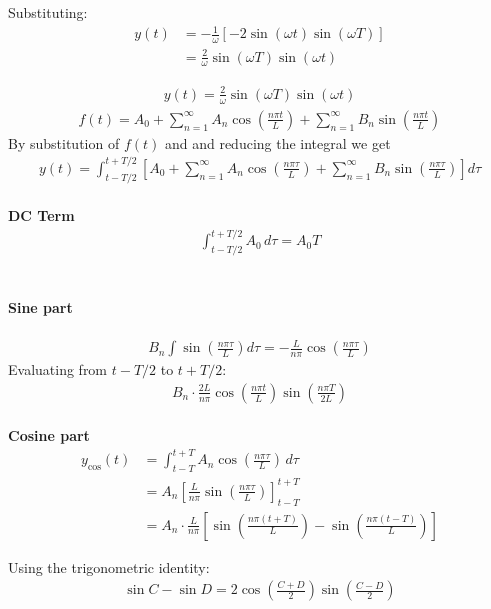Substituting:
\begin{align*}
y(t) &= -\frac{1}{\omega} \left[ -2 \sin(\omega t) \sin(\omega T) \right] \\
&= \frac{2}{\omega} \sin(\omega T) \sin(\omega t)
\end{align*}

\begin{align*}
y(t) = \frac{2}{\omega} \sin(\omega T) \sin(\omega t)    
\end{align*}
\newpage
\begin{align*}
f(t) = A_0 + \sum_{n=1}^\infty A_n \cos\left(\frac{n\pi t}{L}\right) + \sum_{n=1}^\infty B_n \sin\left(\frac{n\pi t}{L}\right)
\end{align*}
By substitution of $f(t)$ and and reducing the integral we get
\begin{align*}
y(t) = \int_{t - T/2}^{t + T/2} \left[ A_0 + \sum_{n=1}^\infty A_n \cos\left(\frac{n\pi \tau}{L}\right) + \sum_{n=1}^\infty B_n \sin\left(\frac{n\pi \tau}{L}\right) \right] d\tau
\end{align*}
\\
\textbf{DC Term}
\begin{align*}
\int_{t - T/2}^{t + T/2} A_0 \, d\tau = A_0 T
\end{align*}
\\
\paragraph{Sine part}
\begin{align*}
B_n \int \sin\left(\frac{n\pi \tau}{L}\right) d\tau = -\frac{L}{n\pi} \cos\left(\frac{n\pi \tau}{L}\right)
\end{align*}
Evaluating from $t - T/2$ to $t + T/2$:
\begin{align*}
B_n \cdot \frac{2L}{n\pi} \cos\left(\frac{n\pi t}{L}\right) \sin\left(\frac{n\pi T}{2L}\right)
\end{align*}
\\
\textbf{Cosine part}
\begin{align*}
y_{\text{cos}}(t) &= \int_{t - T}^{t + T} A_n \cos\left(\frac{n\pi \tau}{L}\right) \, d\tau \\
&= A_n \left[ \frac{L}{n\pi} \sin\left(\frac{n\pi \tau}{L}\right) \right]_{t - T}^{t + T} \\
&= A_n \cdot \frac{L}{n\pi} \left[ \sin\left(\frac{n\pi (t + T)}{L}\right) - \sin\left(\frac{n\pi (t - T)}{L}\right) \right]
\end{align*}

Using the trigonometric identity:
\begin{align*}
\sin C - \sin D = 2 \cos\left(\frac{C + D}{2}\right) \sin\left(\frac{C - D}{2}\right)
\end{align*}

